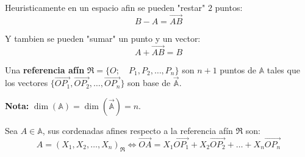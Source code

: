Heuristicamente en un espacio afin se pueden "restar" $2$ puntos:
\[
B - A = \overrightarrow{AB}
\]

Y tambien se pueden "sumar" un punto y un vector:
\[
A + \overrightarrow{AB} = B
\]


\begin{definición}
    Una \textbf{referencia afín} $\mathfrak{R} = \{O ; \quad P_1, P_2, \ldots, P_n\}$ son $n+1$ puntos de $\mathbb{A}$ tales que los vectores $\{\overrightarrow{OP_1}, \overrightarrow{OP_2}, \ldots, \overrightarrow{OP_n}\}$ son base de $\vec{\mathbb{A}}$.\\
\end{definición}

\textbf{Nota: } $\dim(\mathbb{A}) = \dim(\vec{\mathbb{A}}) = n$.

\begin{definición}
    Sea $A \in \mathbb{A}$, sus cordenadas afines respecto a la referencia afín $\mathfrak{R}$ son:
    \[
        A = (X_1, X_2, \ldots, X_n)_{\mathfrak{R}} \iff
        \overrightarrow{OA} = X_1 \overrightarrow{OP_1} + X_2 \overrightarrow{OP_2} + \ldots + X_n \overrightarrow{OP_n}
    \]
\end{definición}

